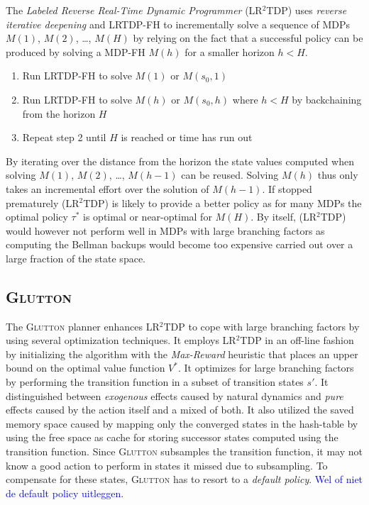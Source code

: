\documentclass[runningheads,a4paper]{llncs}
\newcommand\todo[1]{\textcolor{blue}{#1}}
\begin{document}
The \emph{Labeled Reverse Real-Time Dynamic Programmer} (LR$^2$TDP) uses \emph{reverse iterative deepening} and LRTDP-FH to incrementally solve a sequence of MDPs $M(1)$, $M(2)$, \ldots , $M(H)$ by relying on the fact that a successful policy can be produced by solving a MDP-FH $M(h)$ for a smaller horizon $h < H$.

\begin{enumerate}
	\item Run LRTDP-FH to solve $M(1)$ or $M(s_0, 1)$
	\item Run LRTDP-FH to solve $M(h)$ or $M(s_0, h)$ where $h < H$ by backchaining from the horizon $H$
	\item Repeat step 2 until $H$ is reached or time has run out
\end{enumerate}
By iterating over the distance from the horizon the state values computed when solving $M(1)$, $M(2)$, \ldots, $M(h-1)$ can be reused. Solving $M(h)$ thus only takes an incremental effort over the solution of $M(h-1)$. If stopped prematurely  (LR$^2$TDP) is likely to provide a better policy as for many MDPs the optimal policy $\tau^*$ is optimal or near-optimal for $M(H)$. By itself,  (LR$^2$TDP) would however not perform well in MDPs with large branching factors as computing the Bellman backups would become too expensive carried out over a large fraction of the state space.

\subsection{\textsc{Glutton}}
The \textsc{Glutton} planner enhances LR$^2$TDP to cope with large branching factors by using several optimization techniques. It employs LR$^2$TDP in an off-line fashion by initializing the algorithm with the \emph{Max-Reward} heuristic that places an upper bound on the optimal value function $V^*$. It optimizes for large branching factors by performing the transition function in a subset of transition states $s'$. It distinguished between \emph{exogenous} effects caused by natural dynamics and \emph{pure} effects caused by the action itself and a mixed of both. It also utilized the saved memory space caused by mapping only the converged states in the hash-table by using the free space as cache for storing successor states computed using the transition function.
Since \textsc{Glutton} subsamples the transition function, it may not know a good action to perform in states it missed due to subsampling. To compensate for these states, \textsc{Glutton} has to resort to a \emph{default policy}. \todo{Wel of niet de default policy uitleggen}.
\end{document}
